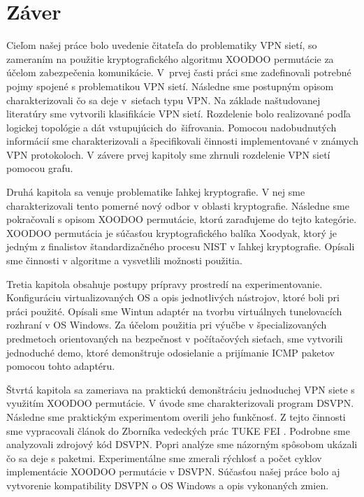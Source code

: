 
\chapter{Záver}
\label{summary}
Cieľom našej práce bolo uvedenie čitateľa do problematiky VPN sietí, so zameraním na použitie kryptografického algoritmu XOODOO permutácie za účelom zabezpečenia komunikácie. V~prvej časti práci sme zadefinovali potrebné pojmy spojené s problematikou VPN sietí. Následne sme postupným opisom charakterizovali čo sa deje v~sieťach typu VPN. Na základe naštudovanej literatúry sme vytvorili klasifikácie VPN sietí. Rozdelenie bolo realizované podľa logickej topológie a dát vstupujúcich do~šifrovania. Pomocou nadobudnutých informácií sme charakterizovali a špecifikovali činnosti implementované v známych VPN protokoloch. V závere prvej kapitoly sme zhrnuli rozdelenie VPN sietí pomocou grafu.

Druhá kapitola sa venuje problematike ľahkej kryptografie. V nej sme charakterizovali tento pomerné nový odbor v oblasti kryptografie. Následne sme pokračovali s opisom XOODOO permutácie, ktorú zaraďujeme do tejto kategórie. XOODOO permutácia je súčasťou kryptografického balíka Xoodyak, ktorý je jedným z finalistov štandardizačného procesu NIST v ľahkej kryptografie. Opísali sme činnosti v algoritme a vysvetlili možnosti použitia. 

Tretia kapitola obsahuje postupy prípravy prostredí na experimentovanie. Konfiguráciu virtualizovaných OS a opis jednotlivých nástrojov, ktoré boli pri práci použité. Opísali sme Wintun adaptér na tvorbu virtuálnych tunelovacích rozhraní v OS Windows. Za účelom použitia pri výučbe v špecializovaných predmetoch orientovaných na bezpečnost v počítačových sieťach, sme vytvorili jednoduché demo, ktoré demonštruje odosielanie a prijímanie ICMP paketov pomocou tohto adaptéru.

Štvrtá kapitola sa zameriava na praktickú demonštráciu jednoduchej VPN siete s využitím XOODOO permutácie. V úvode sme charakterizovali program DSVPN. Následne sme praktickým experimentom overili jeho funkčnosť. Z tejto činnosti sme vypracovali článok do Zborníka vedeckých prác TUKE FEI \cite{clanok}. Podrobne sme analyzovali zdrojový kód DSVPN. Popri analýze sme názorným spôsobom ukázali čo sa deje s paketmi. Experimentálne sme zmerali rýchlosť a počet cyklov implementácie XOODOO permutácie v DSVPN. Súčasťou našej práce bolo aj vytvorenie kompatibility DSVPN o OS Windows a opis vykonaných zmien. 

